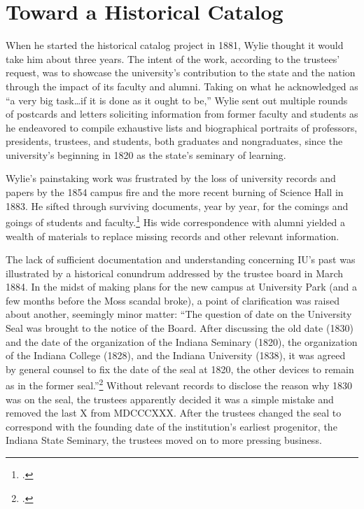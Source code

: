 \documentclass[
  american,
  letterpaper,
]{scrreprt}
\begin{document}
\section{Toward a Historical Catalog}\label{toward-a-historical-catalog}

When he started the historical catalog project in 1881, Wylie thought it
would take him about three years. The intent of the work, according to
the trustees' request, was to showcase the university's contribution to
the state and the nation through the impact of its faculty and alumni.
Taking on what he acknowledged as ``a very big task\ldots if it is done
as it ought to be,'' Wylie sent out multiple rounds of postcards and
letters soliciting information from former faculty and students as he
endeavored to compile exhaustive lists and biographical portraits of
professors, presidents, trustees, and students, both graduates and
nongraduates, since the university's beginning in 1820 as the state's
seminary of learning.

Wylie's painstaking work was frustrated by the loss of university
records and papers by the 1854 campus fire and the more recent burning
of Science Hall in 1883. He sifted through surviving documents, year by
year, for the comings and goings of students and faculty.\footnote{.} His
wide correspondence with alumni yielded a wealth of materials to replace
missing records and other relevant information.

The lack of sufficient documentation and understanding concerning IU's
past was illustrated by a historical conundrum addressed by the trustee
board in March 1884. In the midst of making plans for the new campus at
University Park (and a few months before the Moss scandal broke), a
point of clarification was raised about another, seemingly minor matter:
``The question of date on the University Seal was brought to the notice
of the Board. After discussing the old date (1830) and the date of the
organization of the Indiana Seminary (1820), the organization of the
Indiana College (1828), and the Indiana University (1838), it was agreed
by general counsel to fix the date of the seal at 1820, the other
devices to remain as in the former seal.''\footnote{.}
Without relevant records to disclose the reason why 1830 was on the
seal, the trustees apparently decided it was a simple mistake and
removed the last X from MDCCCXXX. After the trustees changed the seal to
correspond with the founding date of the institution's earliest
progenitor, the Indiana State Seminary, the trustees moved on to more
pressing business.
\end{document}
